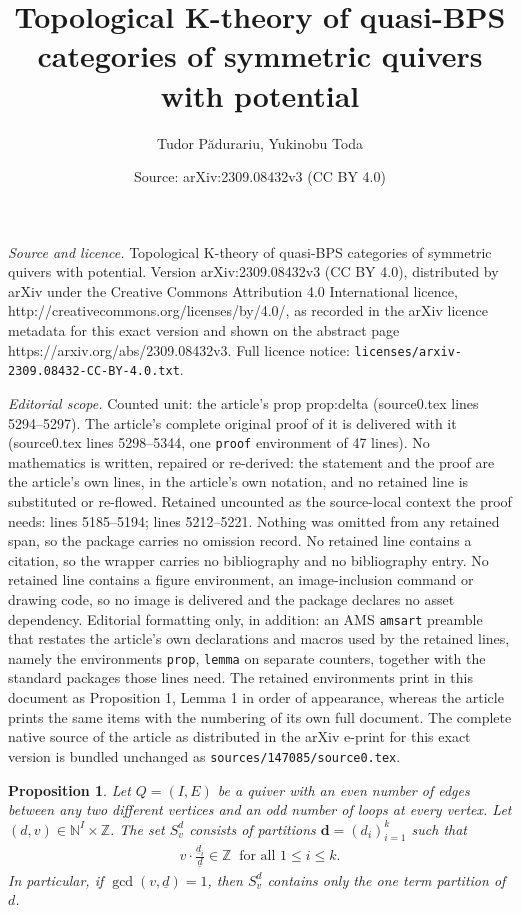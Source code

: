 \documentclass[10pt,a4paper]{amsart}
\title{Topological K-theory of quasi-BPS categories of symmetric quivers with potential}
\author{Tudor P\u{a}durariu, Yukinobu Toda}
\date{Source: arXiv:2309.08432v3 (CC BY 4.0)}
\newtheorem{prop}{Proposition}
\newcommand{\dd}{\underline{d}}
\renewcommand{\leq}{\leqslant}
\begin{document}
\maketitle

\noindent\emph{Source and licence.} Topological K-theory of quasi-BPS categories of symmetric quivers with potential. Version arXiv:2309.08432v3 (CC BY 4.0), distributed by arXiv under the Creative Commons Attribution 4.0 International licence, http://creativecommons.org/licenses/by/4.0/, as recorded in the arXiv licence metadata for this exact version and shown on the abstract page https://arxiv.org/abs/2309.08432v3. Full licence notice: \texttt{licenses/arxiv-2309.08432-CC-BY-4.0.txt}.\par\smallskip

\noindent\textit{Editorial scope.} Counted unit: the article's prop prop:delta (source0.tex lines 5294--5297). The article's complete original proof of it is delivered with it (source0.tex lines 5298--5344, one \texttt{proof} environment of 47 lines). No mathematics is written, repaired or re-derived: the statement and the proof are the article's own lines, in the article's own notation, and no retained line is substituted or re-flowed.  Retained uncounted as the source-local context the proof needs: lines 5185--5194; lines 5212--5221.  Nothing was omitted from any retained span, so the package carries no omission record.  No retained line contains a citation, so the wrapper carries no bibliography and no bibliography entry.  No retained line contains a figure environment, an image-inclusion command or drawing code, so no image is delivered and the package declares no asset dependency.  Editorial formatting only, in addition: an AMS \texttt{amsart} preamble that restates the article's own declarations and macros used by the retained lines, namely the environments \texttt{prop}, \texttt{lemma} on separate counters, together with the standard packages those lines need.  The retained environments print in this document as Proposition 1, Lemma 1 in order of appearance, whereas the article prints the same items with the numbering of its own full document.  The complete native source of the article as distributed in the arXiv e-print for this exact version is bundled unchanged as \texttt{sources/147085/source0.tex}.
\begin{prop}\label{computationsetsdv}
    Let $Q=(I,E)$ be a quiver with an even number of edges between 
    any two different vertices and an odd number of loops at every vertex. 
    Let $(d,v)\in \mathbb{N}^I\times\mathbb{Z}$. 
    The set $S^d_v$ consists of partitions $\mathbf{d}=(d_i)_{i=1}^k$ such that
    \begin{align*}
        v \cdot \frac{\dd_i}{\dd} \in \mathbb{Z} \ \mbox{ for all } 1\leq i\leq k. 
    \end{align*}
    In particular, if $\gcd(v,\dd)=1$, then $S^d_v$ contains only the one term partition of $d$.
\end{prop}
\end{document}
